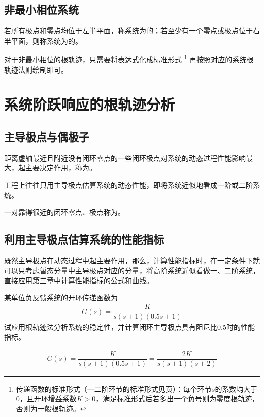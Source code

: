 \subsection{非最小相位系统}
若所有极点和零点均位于左半平面，称系统为的；若至少有一个零点或极点位于右半平面，则称系统为的。

对于非最小相位的根轨迹，只需要将表达式化成标准形式
\footnote[1]{传递函数的标准形式（一二阶环节的标准形式见\pageref{一阶系统的标准形式}页）：每个环节$s$的系数均大于0，且开环增益系数$K>0$，满足标准形式后若多出一个负号则为零度根轨迹，否则为一般根轨迹。}
再按照对应的系统根轨迹法则绘制即可。


\section{系统阶跃响应的根轨迹分析}

\subsection{主导极点与偶极子}
\tdefination[主导极点]
距离虚轴最近且附近没有闭环零点的一些闭环极点对系统的动态过程性能影响最大，起主要决定作用，称为。

工程上往往只用主导极点估算系统的动态性能，即将系统近似地看成一阶或二阶系统。
\vspace*{0.5em}

一对靠得很近的闭环零点、极点称为。
\vspace*{1em}

\subsection{利用主导极点估算系统的性能指标}
既然主导极点在动态过程中起主要作用，那么，计算性能指标时，在一定条件下就可以只考虑暂态分量中主导极点对应的分量，将高阶系统近似看做一、二阶系统，直接应用第三章中计算性能指标的公式和曲线。

\examples \label{4.4}某单位负反馈系统的开环传递函数为
\begin{align*}
	G(s) = \dfrac{K}{s(s + 1)(0.5s + 1)}
\end{align*}
试应用根轨迹法分析系统的稳定性，并计算闭环主导极点具有阻尼比0.5时的性能指标。
\vspace*{1em}

\solve 
\vspace*{-2.9em}
\begin{align*}
	G(s) = \dfrac{K}{s(s + 1)(0.5s + 1)} = \dfrac{2K}{s(s + 1)(s + 2)}
\end{align*}

